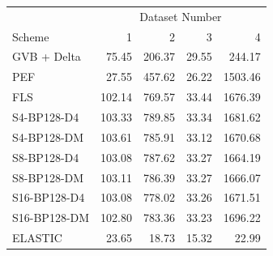 \begin{tabular}{lrrrr}
\toprule
 & \multicolumn{4}{c}{Dataset Number} \\
Scheme & 1 & 2 & 3 & 4 \\
\midrule
GVB + Delta & 75.45 & 206.37 & 29.55 & 244.17 \\
PEF & 27.55 & 457.62 & 26.22 & 1503.46 \\
FLS & 102.14 & 769.57 & 33.44 & 1676.39 \\
S4-BP128-D4 & 103.33 & 789.85 & 33.34 & 1681.62 \\
S4-BP128-DM & 103.61 & 785.91 & 33.12 & 1670.68 \\
S8-BP128-D4 & 103.08 & 787.62 & 33.27 & 1664.19 \\
S8-BP128-DM & 103.11 & 786.39 & 33.27 & 1666.07 \\
S16-BP128-D4 & 103.08 & 778.02 & 33.26 & 1671.51 \\
S16-BP128-DM & 102.80 & 783.36 & 33.23 & 1696.22 \\
ELASTIC & 23.65 & 18.73 & 15.32 & 22.99 \\
\bottomrule
\end{tabular}
